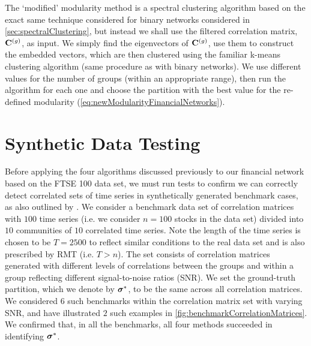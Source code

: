The `modified' modularity method is a spectral clustering algorithm based on the exact same technique considered for binary networks considered in \cref{sec:spectralClustering}, but instead we shall use the filtered correlation matrix, $\mathbf C^{(g)}$, as input.
We simply find the eigenvectors of $\mathbf C^{(g)}$, use them to construct the embedded vectors, which are then clustered using the familiar k-means clustering algorithm (same procedure as with binary networks).
We use different values for the number of groups (within an appropriate range), then run the algorithm for each one and choose the partition with the best value for the re-defined modularity (\cref{eq:newModularityFinancialNetworks}).




\section{Synthetic Data Testing}
\label{sec:syntheticDataTesting}

Before applying the four algorithms discussed previously to our financial network based on the FTSE 100 data set, we must run tests to confirm we can correctly detect correlated sets of time series in synthetically generated benchmark cases, as also outlined by \cite{MG13}.
We consider a benchmark data set of correlation matrices with $100$ time series (i.e. we consider $n = 100$ stocks in the data set) divided into $10$ communities of $10$ correlated time series. Note the length of the time series is chosen to be $T=2500$ to reflect similar conditions to the real data set and is also prescribed by RMT (i.e. $T>n$).
The set consists of correlation matrices generated with different levels of correlations between the groups and within a group reflecting different signal-to-noise ratios (SNR). We set the ground-truth partition, which we denote by $\vecvar{\sigma}^{*}$, to be the same across all correlation matrices.
We considered $6$ such benchmarks within the correlation matrix set with varying SNR, and have illustrated $2$ such examples in \cref{fig:benchmarkCorrelationMatrices}.
We confirmed that, in all the benchmarks, all four methods succeeded in identifying $\vecvar{\sigma}^{*}$.

